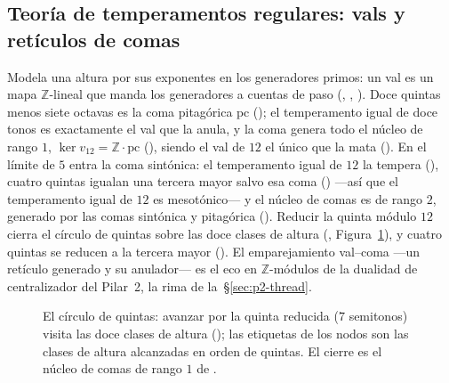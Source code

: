 \subsection{Teoría de temperamentos regulares: vals y retículos de comas}\label{sec:p3-rtt}


Modela una altura por sus exponentes en los generadores primos: un val es un mapa $\mathbb{Z}$-lineal que
manda los generadores a cuentas de paso (, , ). Doce quintas menos siete
octavas es la coma pitagórica $\mathrm{pc}$ (); el temperamento igual de doce
tonos es exactamente el val que la anula, y la coma genera todo el núcleo de rango $1$,
$\ker v_{12}=\mathbb{Z}\cdot\mathrm{pc}$ (), siendo el val de $12$ el único que
la mata (). En el límite de $5$ entra la coma sintónica: el temperamento
igual de $12$ la tempera (), cuatro quintas igualan una tercera mayor salvo
esa coma () ---así que el temperamento igual de $12$ es mesotónico---
y el núcleo de comas es de rango $2$, generado por las comas sintónica y pitagórica
(). Reducir la quinta módulo $12$ cierra el círculo de quintas sobre las doce
clases de altura (, Figura~\ref{fig:p3-fifths}), y cuatro quintas se
reducen a la tercera mayor (). El emparejamiento val--coma ---un
retículo generado y su anulador--- es el eco en $\mathbb{Z}$-módulos de la dualidad de centralizador del
Pilar~2, la rima de la~\S\ref{sec:p2-thread}.

\begin{figure}[ht]
\centering
{}
\caption{El círculo de quintas: avanzar por la quinta reducida ($7$ semitonos) visita las doce clases de
altura (); las etiquetas de los nodos son las clases de altura
alcanzadas en orden de quintas. El cierre es el núcleo de comas de rango $1$ de
.}
\label{fig:p3-fifths}
\end{figure}

